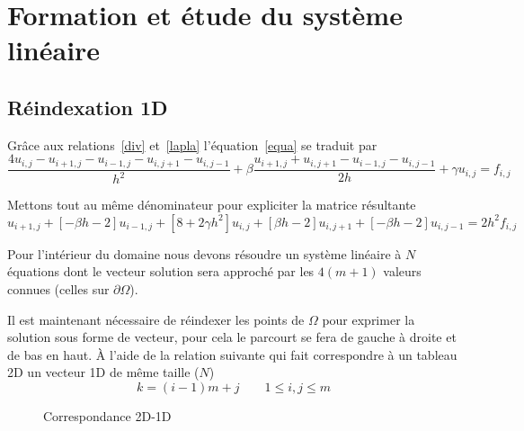 \documentclass[twoside,12pt]{report}
\theoremstyle{remark}
\begin{document}
\chapter{Formation et étude du système linéaire}

\section{Réindexation 1D}

Grâce aux relations~\eqref{div} et~\eqref{lapla} l'équation~\eqref{equa} se traduit par
\begin{equation*}
\frac{4u_{i,j}-u_{i+1,j}-u_{i-1,j}-u_{i,j+1}-u_{i,j-1}}{h^2} + \beta \frac{u_{i+1,j}+u_{i,j+1}-u_{i-1,j}-u_{i,j-1}}{2h} + \gamma u_{i,j} = f_{i,j}
\end{equation*}

Mettons tout au même dénominateur pour expliciter la matrice résultante
\begin{equation}
[\beta h-2]u_{i+1,j}+[-\beta h -2]u_{i-1,j}+[8+2\gamma h^2]u_{i,j}+[\beta h-2]u_{i,j+1}+[-\beta h -2]u_{i,j-1}=2h^2 f_{i,j} \label{equadiscre}
\end{equation}

Pour l'intérieur du domaine nous devons résoudre un système linéaire à $N$ équations dont le vecteur solution sera approché par les $4(m+1)$ valeurs connues (celles sur $\partial \Omega$).

Il est maintenant nécessaire de réindexer les points de $\Omega$ pour exprimer la solution sous forme de vecteur, pour cela le parcourt se fera de gauche à droite et de bas en haut. À l'aide de la relation suivante qui fait correspondre à un tableau 2D un vecteur 1D de même taille ($N$)
\begin{equation}
k=(i-1)m+j\qquad 1\leq i,j \leq m \label{indice}
\end{equation}

\begin{figure}
\hspace{6cm}
\caption{Correspondance 2D-1D}
\end{figure}
\end{document}
